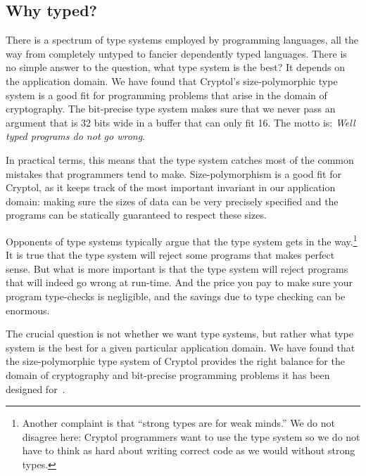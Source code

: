 \subsection{Why typed?}
\label{sec:why-typed}

There is a spectrum of type systems employed by programming languages,
all the way from completely untyped to fancier dependently typed
languages.  There is no simple answer to the question, what type system
is the best? It depends on the application domain. We have found that
Cryptol's size-polymorphic type system is a good fit for programming
problems that arise in the domain of cryptography. The bit-precise
type system makes sure that we never pass an argument that is 32 bits
wide in a buffer that can only fit 16. The motto is: {\em Well typed
  programs do not go wrong}.

In practical terms, this means that the type system catches most of
the common mistakes that programmers tend to make. Size-polymorphism
is a good fit for Cryptol, as it keeps track of the most important
invariant in our application domain: making sure the sizes of data can
be very precisely specified and the programs can be statically
guaranteed to respect these sizes.

Opponents of type systems typically argue that the type system gets in
the way.\footnote{Another complaint is that ``strong types are for
  weak minds.'' We do not disagree here: Cryptol programmers want to
  use the type system so we do not have to think as hard about writing
  correct code as we would without strong types.}  It is true that
the type system will reject some programs that makes perfect
sense. But what is more important is that the type system will reject
programs that will indeed go wrong at run-time. And the price you pay
to make sure your program type-checks is negligible, and the savings
due to type checking can be enormous.

The crucial question is not whether we want type systems, but rather
what type system is the best for a given particular application
domain. We have found that the size-polymorphic type system of Cryptol
provides the right balance for the domain of cryptography and
bit-precise programming problems it has been designed
for~\cite{lewis2003}.


